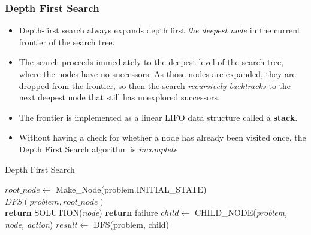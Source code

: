\documentclass{article}
\theoremstyle{plain}
\theoremstyle{definition}
\begin{document}
\subsubsection{Depth First Search}
\begin{itemize}
    \item Depth-first search always expands depth first \textit{the deepest node} in the current frontier of the search tree.
    
    \item The search proceeds immediately to the deepest level of the search tree, where the nodes have no successors. As those nodes are expanded, they are dropped from the frontier, so then the search \textit{recursively backtracks} to the next deepest node that still has unexplored successors.
    
    \item The frontier is implemented as a linear LIFO data structure called a \textbf{stack}.
    
    \item Without having a check for whether a node has already been visited once, the Depth First Search algorithm is \textit{incomplete} 
\end{itemize}

\begin{algorithm}
    \caption{Depth First Search}
    \begin{algorithmic}
            \State $root\_node \gets $ Make\_Node(problem.INITIAL\_STATE)
            \State $DFS(problem, root\_node)$
        \EndProcedure\\
        
                \State \textbf{return} SOLUTION(\textit{node})
            \Else 
                \State \textbf{return} failure
            \EndIf
                \State $child \gets$ CHILD\_NODE(\textit{problem, node, action})
                \State $result \gets$ DFS(problem, child)
            \EndFor
        
        \EndProcedure
    \end{algorithmic}
\end{algorithm}
\end{document}
